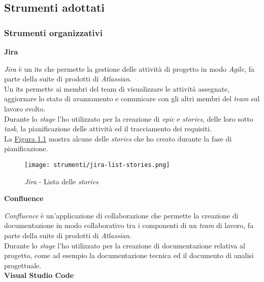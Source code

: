 \pagebreak

\subsection{Strumenti adottati}
\label{sez:strumenti-adottati}

\subsubsection{Strumenti organizzativi}
\label{sez:strumenti-organizzativi}

\noindent \textbf{Jira\\}

\noindent \textit{Jira} è un \gls{its} che permette la gestione delle attività di progetto in modo \textit{Agile}, fa parte della suite di prodotti di \textit{Atlassian}.\\
Un \gls{its} permette ai membri del team di visualizzare le attività assegnate, aggiornare lo stato di avanzamento e comunicare con gli altri membri del \textit{team} sul lavoro svolto. \\
Durante lo \textit{stage} l'ho utilizzato per la creazione di \textit{epic} e \textit{stories}, delle loro sotto \textit{task}, la pianificazione delle attività ed il tracciamento dei requisiti. \\
La {\hyperref[fig:jira-list-stories]{Figura 1.1}} mostra alcune delle \textit{stories} che ho creato durante la fase di pianificazione.
\begin{figure}[H]
    \label{fig:jira-list-stories}
    \centering
    \texttt{[image: strumenti/jira-list-stories.png]}
    \caption{\textit{Jira} - Lista delle \textit{stories}}
\end{figure}

\noindent \textbf{Confluence\\}

\noindent \textit{Confluence} è un'applicazione di collaborazione che permette la creazione di documentazione in modo collaborativo tra i componenti di un \textit{team} di lavoro, fa parte della suite di prodotti di \textit{Atlassian}.\\
Durante lo \textit{stage} l'ho utilizzato per la creazione di documentazione relativa al progetto, come ad esempio la documentazione tecnica ed il documento di analisi progettuale.\\

\pagebreak
\noindent \textbf{Visual Studio Code\\}

